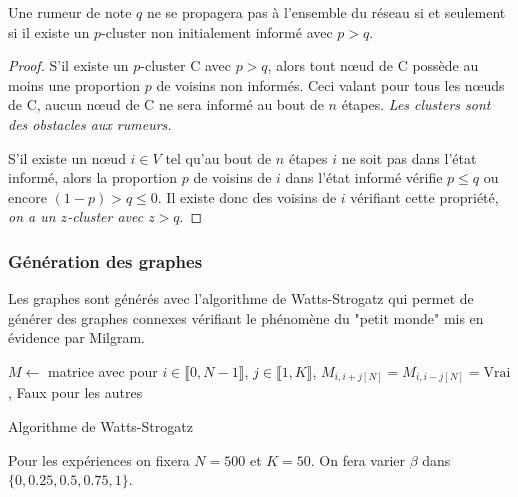 \documentclass{article}
\begin{document}
\begin{theo}
  Une rumeur de note $q$ ne se propagera pas à l'ensemble du réseau si et seulement si il existe un $p$-cluster non initialement informé avec $p>q$.
\end{theo}
\begin{proof}
  S'il existe un $p$-cluster C avec $p>q$, alors tout nœud de C possède au moins une proportion $p$ de voisins non informés. Ceci valant pour tous les nœuds de C, aucun nœud de C ne sera informé au bout de $n$ étapes. \emph{Les clusters sont des obstacles aux rumeurs.}

  S'il existe un nœud $i\in V$ tel qu'au bout de $n$ étapes $i$ ne soit pas dans l'état informé, alors la proportion $p$ de voisins de $i$ dans l'état informé vérifie $p \leq q$ ou encore $(1-p) > q \leq 0$. Il existe donc des voisins de $i$ vérifiant cette propriété, \emph{on a un $z$-cluster avec $z>q$}.
\end{proof}

\subsubsection{Génération des graphes}

Les graphes sont générés avec l'algorithme de Watts-Strogatz qui permet de générer des graphes connexes vérifiant le phénomène du "petit monde" mis en évidence par Milgram.

\begin{algorithm}[H]
$M \leftarrow $ matrice avec pour $i\in \llbracket0,N-1\rrbracket$, $j\in \llbracket1,K\rrbracket$, $M_{i,i+j[N]} = M_{i,i-j[N]} = \text{Vrai}$, Faux pour les autres \;
\caption{Algorithme de Watts-Strogatz}
\end{algorithm}

Pour les expériences on fixera $N=500$ et $K=50$. On fera varier $\beta$ dans $\{0,0.25,0.5,0.75,1\}$.
\end{document}
